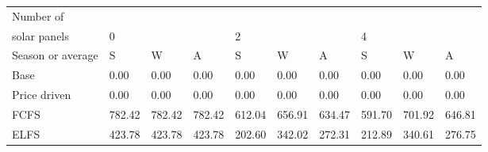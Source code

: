 \begin{table}[h] 
\centering 
\begin{tabular}{l|lll|lll|lll}Number of \\ solar panels&0& & &2& & &4& & \\ \hline 
Season or average & S & W & A & S & W & A & S & W & A \\ \hline 
Base&0.00&0.00&0.00&0.00&0.00&0.00&0.00&0.00&0.00 \\ 
Price driven&0.00&0.00&0.00&0.00&0.00&0.00&0.00&0.00&0.00 \\ 
FCFS&782.42&782.42&782.42&612.04&656.91&634.47&591.70&701.92&646.81 \\ 
ELFS&423.78&423.78&423.78&202.60&342.02&272.31&212.89&340.61&276.75 \\ 
\end{tabular} 
\end{table}